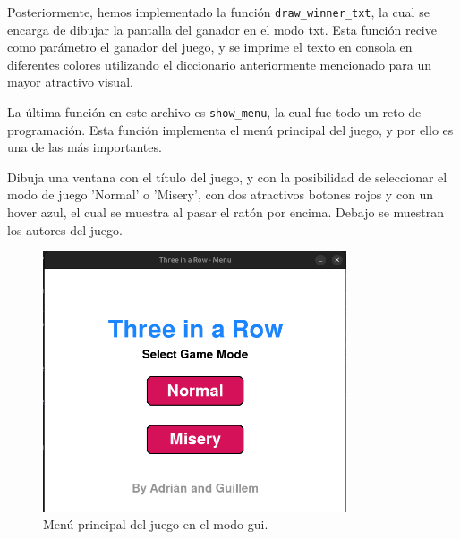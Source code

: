 \documentclass[a4paper,12pt]{article}
\begin{document}
\vspace{\baselineskip}
Posteriormente, hemos implementado la función \texttt{draw\_winner\_txt}, la cual se encarga de dibujar la pantalla del ganador en el modo txt. Esta función recive como parámetro 
el ganador del juego, y se imprime el texto en consola en diferentes colores utilizando el diccionario anteriormente mencionado para un mayor atractivo visual.

\vspace{\baselineskip}
La última función en este archivo es \texttt{show\_menu}, la cual fue todo un reto de programación. Esta función implementa el menú
principal del juego, y por ello es una de las más importantes.

\vspace{\baselineskip}
Dibuja una ventana con el título del juego, y con la posibilidad de seleccionar el modo de juego 'Normal' o 'Misery', con dos atractivos 
botones rojos y con un hover azul, el cual se muestra al pasar el ratón por encima. Debajo se muestran los autores del juego.
\begin{figure}[htbp]
    \centering
    \includegraphics[width=0.8\textwidth]{./imagenes/menu_inicio.png}
    \caption{Menú principal del juego en el modo gui.}
    \label{fig:etiqueta}
\end{figure}
\end{document}
